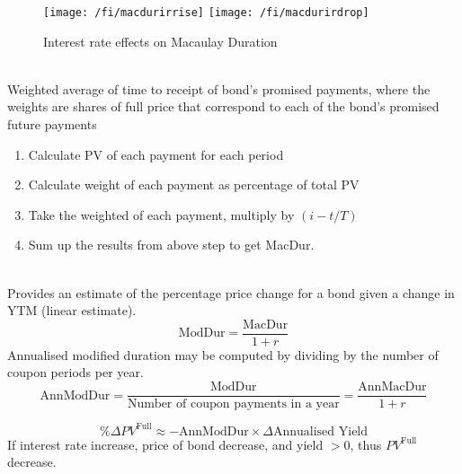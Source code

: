 \begin{figure}[H]
\centering
\texttt{[image: /fi/macdurirrise]}\hfill
\texttt{[image: /fi/macdurirdrop]}
\caption{Interest rate effects on Macaulay Duration}
\end{figure}

\begin{remark} \\
Weighted average of time to receipt of bond’s promised payments, where the weights are shares of full price that correspond to each of the bond’s promised future payments
\end{remark}

\begin{method} 
\begin{enumerate}[label=\roman*.]
\setlength{\itemsep}{0pt}
\item Calculate PV of each payment for each period
\item Calculate weight of each payment as percentage of total PV
\item Take the weighted of each payment, multiply by $(i-t/T)$
\item Sum up the results from above step to get MacDur.
\end{enumerate}
\end{method}

\begin{definition} \\
Provides an estimate of the percentage price change for a bond given a change in YTM (linear estimate).
\begin{equation}
\text{ModDur} = \frac{\text{MacDur}}{1+r} \nonumber
\end{equation}
Annualised modified duration may be computed by dividing by the number of coupon periods per year.
\begin{equation}
\text{AnnModDur} = \frac{\text{ModDur}}{\text{Number of coupon payments in a year}} \nonumber = \frac{\text{AnnMacDur}}{1+r} \nonumber
\end{equation}
\end{definition}

\begin{remark} 
\begin{equation}
\%\Delta PV^{\text{Full}} \approx - \text{AnnModDur} \times \Delta \text{Annualised Yield} \nonumber
\end{equation}
If interest rate increase, price of bond decrease, and yield $>0$, thus $PV^{\text{Full}}$ decrease.
\end{remark}

